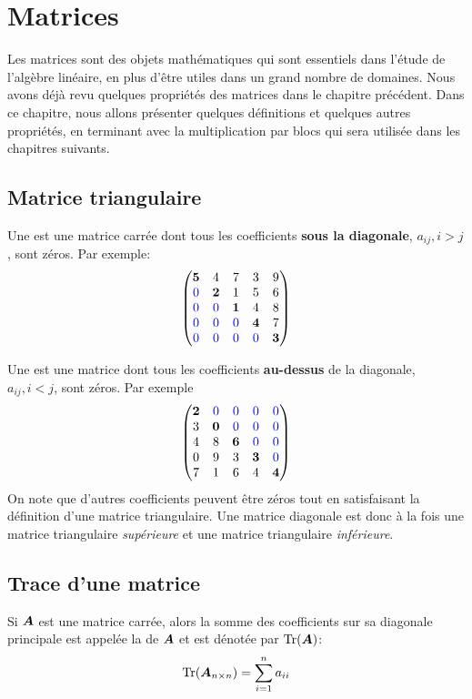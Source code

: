\chapter{Matrices}
Les matrices sont des objets mathématiques qui sont essentiels dans
l'étude de l'algèbre linéaire, en plus d'être utiles dans un grand
nombre de domaines.  Nous avons déjà revu quelques propriétés
des matrices dans le chapitre précédent. Dans ce chapitre, nous allons présenter
quelques définitions et quelques autres propriétés, 
en terminant avec la multiplication par blocs qui sera utilisée dans les chapitres suivants.

\section{Matrice triangulaire}

Une  est une matrice carrée dont
tous les coefficients \textbf{sous la diagonale}, $a_{ij}, i > j$, sont zéros. Par exemple:
\newcommand{\zb}{{\color{blue}0}}
\[
\begin{pmatrix}
\mathbf{5} & 4 & 7 & 3 & 9\\
\zb & \mathbf{2} & 1 & 5 & 6 \\
\zb & \zb & \mathbf{1} & 4 & 8 \\
\zb & \zb & \zb & \mathbf{4} & 7 \\
\zb & \zb & \zb & \zb & \mathbf{3}
\end{pmatrix}
\]

Une  est une matrice dont
tous les coefficients \textbf{au-dessus} de la diagonale, $a_{ij}, i < j$, sont zéros.
Par exemple
\[
\begin{pmatrix}
\mathbf{2} & \zb &\zb & \zb &\zb\\
3 & \mathbf{0} &\zb &\zb & \zb \\
4 & 8 & \mathbf{6} & \zb & \zb \\
0 & 9 & 3 & \mathbf{3} & \zb \\
7 & 1 & 6 & 4 & \mathbf{4}
\end{pmatrix}
\]
On note que d'autres coefficients peuvent être zéros tout en satisfaisant la définition
d'une matrice triangulaire.
Une matrice diagonale est donc à la fois une matrice triangulaire \textit{supérieure} et une
matrice triangulaire \textit{inférieure}.

\pagebreak
\section{Trace d'une matrice}
\begin{defini}
Si $\boldsymbol{A}$ est une matrice carrée, alors la somme des coefficients sur sa
diagonale principale est appelée la  de $\boldsymbol{A}$ et
est dénotée par $\operatorname{Tr}(\boldsymbol{A})$:
\[
\operatorname{Tr}(\boldsymbol{A}_{n\times n}) = \sum_{i=1}^n a_{ii}
\]
\end{defini}

